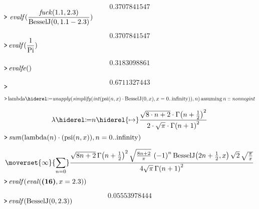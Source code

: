 \documentclass{article}
\begin{document}
\begin{dmath}\label{(11)}
 0.3707841547
\end{dmath}
\mapleinput
{$ \displaystyle \texttt{>\,} \,\mathit{evalf} (\frac{\mathit{fuck} ( 1.1, 2.3)}{\mathrm{BesselJ}(0, 1.1- 2.3)}) $}

\begin{dmath}\label{(12)}
 0.3707841547
\end{dmath}
\mapleinput
{$ \displaystyle \texttt{>\,} \mathit{evalf} (\frac{1}{\mathrm{Pi}}) $}

\begin{dmath}\label{(13)}
 0.3183098861
\end{dmath}
\mapleinput
{$ \displaystyle \texttt{>\,} \mathit{evalfe} () $}

\begin{dmath}\label{(14)}
 0.6711327443
\end{dmath}
\mapleinput
{$ \displaystyle \texttt{>\,} \, $}

\mapleinput
{$ \displaystyle \texttt{>\,} \mathrm{lambda}\coloneqq \mathit{unapply} (\mathit{simplify} (\mathit{int} (\mathrm{psi}(n ,x)\cdot \mathrm{BesselJ}(0,x),x =0..\mathrm{infinity})),n)\,\mathrm{assuming}\,n ::\mathit{nonnegint}  $}

\begin{dmath}\label{(15)}
\lambda \coloneqq n \hiderel{\mapsto }\frac{\sqrt{8\cdot n +2}\cdot \Gamma \! \left(n +\frac{1}{2}\right)^{2}}{2\cdot \sqrt{\pi}\cdot \Gamma \! \left(n +1\right)^{2}}
\end{dmath}
\mapleinput
{$ \displaystyle \texttt{>\,} \mathit{sum} (\mathrm{lambda}(n)\cdot (\mathrm{psi}(n ,x)),n =0..\mathrm{infinity}) $}

\begin{dmath}\label{(16)}
\moverset{\infty}{\munderset{n =0}{\sum}}\frac{\sqrt{8 n +2}\, \Gamma \! \left(n +\frac{1}{2}\right)^{2} \sqrt{\frac{8 n +2}{\pi}}\, \left(-1\right)^{n} \mathrm{BesselJ}\! \left(2 n +\frac{1}{2},x \right) \sqrt{2}\, \sqrt{\frac{\pi}{x}}}{4 \sqrt{\pi}\, \Gamma \! \left(n +1\right)^{2}}
\end{dmath}
\mapleinput
{$ \displaystyle \texttt{>\,} \mathit{evalf} (\mathit{eval} (\mapleref{(16)},x = 2.3)) $}

\begin{dmath}\label{(17)}
 0.05553978444
\end{dmath}
\mapleinput
{$ \displaystyle \texttt{>\,} \mathit{evalf} (\mathrm{BesselJ}(0, 2.3)) $}
\end{document}
